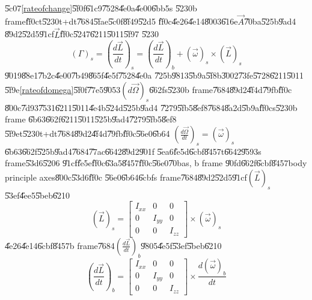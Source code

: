 \documentclass[12pt,a4paper]{article}
\begin{document}
\bigskip

\U{5c07}\ref{rateofchange}\U{5f0f}\U{61c9}\U{7528}\U{4e0a}\U{4e00}\U{6bb5}s%
\U{5230}b frame\U{ff0c}t\U{5230}t+dt\U{7684}\U{5fae}\U{5c0f}\U{8f49}\U{52d5}%
\U{ff0c}\U{4e26}\U{4e14}\U{8003}\U{616e}$\vec{A}$\U{70ba}\U{525b}\U{9ad4}%
\U{89d2}\U{52d5}\U{91cf}$\vec{L}$\U{ff0c}\U{5247}\U{6211}\U{5011}\U{5f97}%
\U{5230}%
\begin{equation}
\left( \Gamma \right) _{s}=\left( \frac{d\vec{L}}{dt}\right) _{s}=\left( 
\frac{d\vec{L}}{dt}\right) _{b}+\left( \vec{\omega}\right) _{s}\times \left( 
\vec{L}\right) _{s}  \label{liw}
\end{equation}%
\U{9019}\U{88e1}\U{7b2c}\U{4e00}\U{7b49}\U{865f}\U{4e5f}\U{7528}\U{4e0a}%
\U{725b}\U{9813}\U{5b9a}\U{5f8b}\U{3002}\U{73fe}\U{5728}\U{6211}\U{5011}%
\U{5f9e}\ref{rateofdomega}\U{5f0f}\U{77e5}\U{9053}$\left( d\vec{\Omega}%
\right) _{s}$\U{662f}s\U{5230}b frame\U{7684}\U{89d2}\U{4f4d}\U{79fb}\U{ff0c}%
\U{800c}\U{7d93}\U{7531}\U{6211}\U{5011}\U{4e4b}\U{524d}\U{525b}\U{9ad4}%
\U{7279}\U{5fb5}\U{8ef8}\U{7684}\U{8a2d}\U{5b9a}\U{ff0c}s\U{5230}b frame%
\U{6b63}\U{662f}\U{6211}\U{5011}\U{525b}\U{9ad4}\U{7279}\U{5fb5}\U{8ef8}%
\U{5f9e}t\U{5230}t+dt\U{7684}\U{89d2}\U{4f4d}\U{79fb}\U{ff0c}\U{56e0}\U{6b64}%
$\left( \frac{d\vec{\Omega}}{dt}\right) _{s}=\left( \vec{\omega}\right) _{s}$%
\U{6b63}\U{662f}\U{525b}\U{9ad4}\U{7684}\U{77ac}\U{6642}\U{89d2}\U{901f}%
\U{5ea6}\U{fe5d}\U{6cbf}\U{8457}t\U{6642}\U{9593}s frame\U{53d6}\U{5206}%
\U{91cf}\U{fe5e}\U{ff0c}\U{63a5}\U{8457}\U{ff0c}\U{56e0}\U{70ba}s, b frame%
\U{90fd}\U{662f}\U{6cbf}\U{8457}body principle axes\U{800c}\U{53d6}\U{ff0c}%
\U{56e0}\U{6b64}\U{6cbf}s frame\U{7684}\U{89d2}\U{52d5}\U{91cf}$\left( \vec{L%
}\right) _{s}$\U{53ef}\U{4ee5}\U{5beb}\U{6210}%
\begin{equation*}
\left( \vec{L}\right) _{s}=\left[ 
\begin{array}{ccc}
I_{xx} & 0 & 0 \\ 
0 & I_{yy} & 0 \\ 
0 & 0 & I_{zz}%
\end{array}%
\right] \times \left( \vec{\omega}\right) _{s}
\end{equation*}%
\U{4e26}\U{4e14}\U{6cbf}\U{8457}b frame\U{7684}$\left( \frac{d\vec{L}}{dt}%
\right) _{b}$\U{9805}\U{4e5f}\U{53ef}\U{5beb}\U{6210}%
\begin{equation*}
\left( \frac{d\vec{L}}{dt}\right) _{b}=\left[ 
\begin{array}{ccc}
I_{xx} & 0 & 0 \\ 
0 & I_{yy} & 0 \\ 
0 & 0 & I_{zz}%
\end{array}%
\right] \times \frac{d\left( \vec{\omega}\right) _{b}}{dt}
\end{equation*}%
\end{document}
